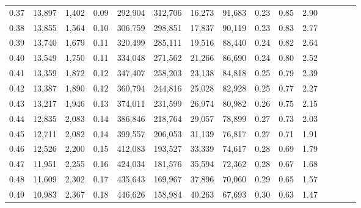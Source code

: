 \begin{tabular}{rrrcrrrrrrrrrrr}
0.37 &  13,897 &  1,402 &                                       0.09 &  292,904 &  312,706 &   16,273 &   91,683 &  0.23 &  0.85 &                         2.90 \\
0.38 &  13,855 &  1,564 &                                       0.10 &  306,759 &  298,851 &   17,837 &   90,119 &  0.23 &  0.83 &                         2.77 \\
0.39 &  13,740 &  1,679 &                                       0.11 &  320,499 &  285,111 &   19,516 &   88,440 &  0.24 &  0.82 &                         2.64 \\
0.40 &  13,549 &  1,750 &                                       0.11 &  334,048 &  271,562 &   21,266 &   86,690 &  0.24 &  0.80 &                         2.52 \\
0.41 &  13,359 &  1,872 &                                       0.12 &  347,407 &  258,203 &   23,138 &   84,818 &  0.25 &  0.79 &                         2.39 \\
0.42 &  13,387 &  1,890 &                                       0.12 &  360,794 &  244,816 &   25,028 &   82,928 &  0.25 &  0.77 &                         2.27 \\
0.43 &  13,217 &  1,946 &                                       0.13 &  374,011 &  231,599 &   26,974 &   80,982 &  0.26 &  0.75 &                         2.15 \\
0.44 &  12,835 &  2,083 &                                       0.14 &  386,846 &  218,764 &   29,057 &   78,899 &  0.27 &  0.73 &                         2.03 \\
0.45 &  12,711 &  2,082 &                                       0.14 &  399,557 &  206,053 &   31,139 &   76,817 &  0.27 &  0.71 &                         1.91 \\
0.46 &  12,526 &  2,200 &                                       0.15 &  412,083 &  193,527 &   33,339 &   74,617 &  0.28 &  0.69 &                         1.79 \\
0.47 &  11,951 &  2,255 &                                       0.16 &  424,034 &  181,576 &   35,594 &   72,362 &  0.28 &  0.67 &                         1.68 \\
0.48 &  11,609 &  2,302 &                                       0.17 &  435,643 &  169,967 &   37,896 &   70,060 &  0.29 &  0.65 &                         1.57 \\
0.49 &  10,983 &  2,367 &                                       0.18 &  446,626 &  158,984 &   40,263 &   67,693 &  0.30 &  0.63 &                         1.47 \\

\end{tabular}
